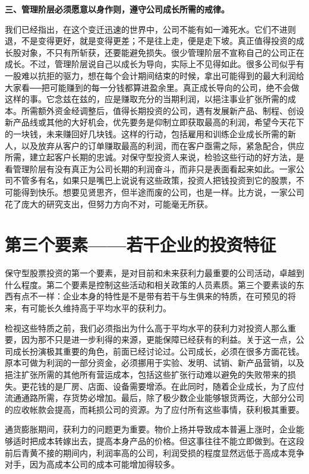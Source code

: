 \documentclass[UTF8,a4paper,zihao=-4,fontset = windows]{ctexart} %
\begin{document}
\textbf{三、管理阶层必须愿意以身作则，遵守公司成长所需的戒律。}


我们已经指出，在这个变迁迅速的世界中，公司不能有如一滩死水。它们不进则退，不是变得更好，就是变得更差；不是往上走，便是走下坡。真正值得投资的成长股对象，不只有所斩获，还要能避免损失。很少管理阶层不宣称自己的公司正在成长。不过，管理阶层说自己以成长为导向，实际上不见得如此。很多公司似乎有一股难以抗拒的驱力，想在每个会计期间结束的时候，拿出可能得到的最大利润给大家看──把可能赚到的每一分钱都算进盈余里。真正成长导向的公司，绝不会做这样的事。它念兹在兹的，应是赚取充分的当期利润，以挹注事业扩张所需的成本。所需额外资金经调整后，值得长期投资的公司，遇有发展新产品、制程、创设新产品线或其他的大好机会，优先要务是仰制立即获取最高的利润，希望今天花下的一块钱，未来赚回好几块钱。这样的行动，包括雇用和训练企业成长所需的新人，以及放弃从客户的订单赚取最高的利润，而在客户亟需之际，紧急配合，供应所需，建立起客户长期的忠诚。对保守型投资人来说，检验这些行动的好方法，是看管理阶层有没有真正为公司长期的利润奋斗，而非只是表面看起来如此。一家公司不管多有名，如果只是嘴巴上说说有这些政策，投资人把钱投资到它的股票，不可能得到快乐。想要见贤思齐，但半途而废的公司，也是一样。比方说，一家公司花了庞大的研究支出，但努力方向不对，可能毫无所获。

\section{第三个要素——若干企业的投资特征}

保守型股票投资的第一个要素，是对目前和未来获利力最重要的公司活动，卓越到什么程度。第二个要素是控制这些活动和相关政策的人员素质。第三个要素谈的东西有点不一样：企业本身的特性是不是带有若干与生俱来的特质，在可预见的将来，有可能长久维持高于平均水平的获利力。

检视这些特质之前，我们必须指出为什么高于平均水平的获利力对投资人那么重要，因为那不只是进一步利得的来源，更能保障已经获有的利益。关于这一点，公司成长扮演极其重要的角色，前面已经讨论过。公司成长，必须在很多方面花钱。原本可做为利润的一部分资金，必须挪用于实验、发明、试销、新产品营销，以及挹注扩张所需的其他所有营运成本，包括这些扩张行动难以避免的失败带来的损失。更花钱的是厂房、店面、设备需要增添。在此同时，随着企业成长，为了应付流通通路所需，存货势必增加。最后，除了极少数企业能够银货两讫，大部分公司的应收帐款会提高，而耗损公司的资源。为了应付所有这些事情，获利极其重要。

通货膨胀期间，获利力的问题更为重要。物价上扬并导致成本普遍上涨时，企业能够适时把成本转嫁出去，提高本身产品的价格。但这事往往不能立即做到。在这段前后青黄不接的期间内，利润率高的公司，利润受损的程度显然远低于高成本竞争对手，因为高成本公司的成本可能增加得较多。
\end{document}
